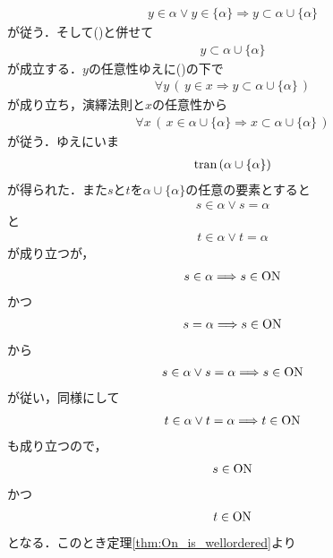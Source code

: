 \begin{sketch}
\begin{description}
\begin{align}
					y \in \alpha \vee y \in \{\alpha\} \Longrightarrow y \subset \alpha \cup \{\alpha\}
				\end{align}
				が従う．そして()と併せて
				\begin{align}
					y \subset \alpha \cup \{\alpha\}
				\end{align}
				が成立する．$y$の任意性ゆえに()の下で
				\begin{align}
					\forall y\, \left(\, y \in x \Longrightarrow y \subset \alpha \cup \{\alpha\}\, \right)
				\end{align}
				が成り立ち，演繹法則と$x$の任意性から
				\begin{align}
					\forall x\, \left(\, x \in \alpha \cup \{\alpha\} \Longrightarrow x \subset \alpha \cup \{\alpha\}\, \right)
				\end{align}
				が従う．ゆえにいま
				\begin{align}
					\operatorname*{tran}\hspace{0.15em}(\alpha \cup \{\alpha\})
					\label{fom:thm_latter_element_is_ordinal_4}
				\end{align}
				が得られた．また$s$と$t$を$\alpha \cup \{\alpha\}$の任意の要素とすると
				\begin{align}
					s \in \alpha \vee s = \alpha
				\end{align}
				と
				\begin{align}
					t \in \alpha \vee t = \alpha
				\end{align}
				が成り立つが，
				\begin{align}
					s \in \alpha \Longrightarrow s \in \mathrm{ON}
				\end{align}
				かつ
				\begin{align}
					s = \alpha \Longrightarrow s \in \mathrm{ON}
				\end{align}
				から
				\begin{align}
					s \in \alpha \vee s = \alpha \Longrightarrow s \in \mathrm{ON}
				\end{align}
				が従い，同様にして
				\begin{align}
					t \in \alpha \vee t = \alpha \Longrightarrow t \in \mathrm{ON}
				\end{align}
				も成り立つので，
				\begin{align}
					s \in \mathrm{ON}
				\end{align}
				かつ
				\begin{align}
					t \in \mathrm{ON}
				\end{align}
				となる．このとき定理\ref{thm:On_is_wellordered}より
				\begin{align}

\end{align}
\end{description}
\end{sketch}
